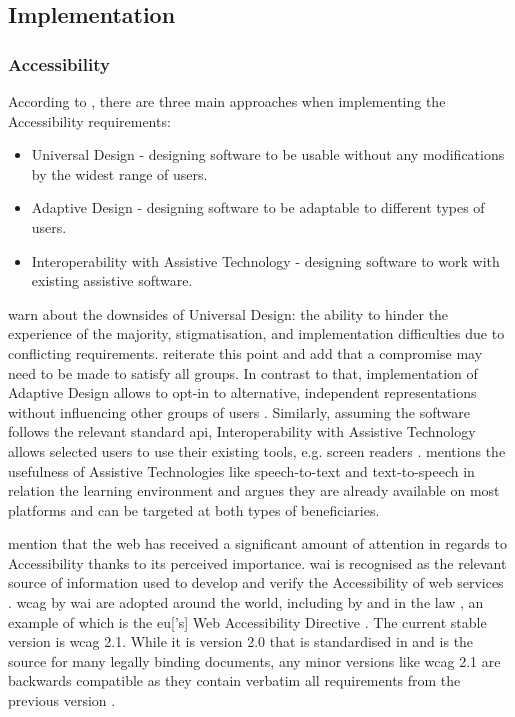 \subsection{Implementation}
\label{Literature-HSIE-Implementation}

\subsubsection{Accessibility}

According to \textcite[p. 296]{Wegge_Zimmermann_2007}, there are three main approaches when implementing the Accessibility requirements:

\begin{itemize}
    \item Universal Design - designing software to be usable without any modifications by the widest range of users.
    \item Adaptive Design - designing software to be adaptable to different types of users.
    \item Interoperability with Assistive Technology - designing software to work with existing assistive software.
\end{itemize}

\textcite{Wegge_Zimmermann_2007} warn about the downsides of Universal Design: the ability to hinder the experience of the majority, stigmatisation, and implementation difficulties due to conflicting requirements.
\textcite{Juergen_et_all_2020} reiterate this point and add that a compromise may need to be made to satisfy all groups.
In contrast to that, implementation of Adaptive Design allows to opt-in to alternative, independent representations without influencing other groups of users \parencite{Wegge_Zimmermann_2007}.
Similarly, assuming the software follows the relevant standard \gls{api}, Interoperability with Assistive Technology allows selected users to use their existing tools, e.g. screen readers \parencite{Wegge_Zimmermann_2007}.
\textcite{Edyburn_2021} mentions the usefulness of Assistive Technologies like speech-to-text and text-to-speech in relation the learning environment and argues they are already available on most platforms and can be targeted at both types of beneficiaries.

\textcite{Juergen_et_all_2020} mention that the web has received a significant amount of attention in regards to Accessibility thanks to its perceived importance.
\gls{wai} is recognised as the relevant source of information used to develop and verify the Accessibility of web services \parencite{WAI_Intro}.
\gls{wcag} by \gls{wai} are adopted around the world, including by \textcite{ISO_40500:2012} and in the law \parencite{WAI_Policies}, an example of which is the \gls{eu}['s] Web Accessibility Directive \parencite{EU_Web_Accessibility}.
The current stable version is \gls{wcag} 2.1. While it is version 2.0 that is standardised in \textcite{ISO_40500:2012} and is the source for many legally binding documents, any minor versions like \gls{wcag} 2.1 are backwards compatible as they contain verbatim all requirements from the previous version \parencite{WAI_WCAG}.

